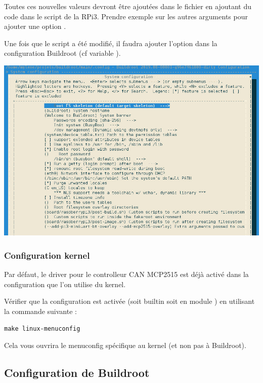 Toutes ces nouvelles valeurs devront être ajoutées dans le fichier 
en ajoutant du code dans le script  de la RPi3. Prendre
exemple sur les autres arguments pour ajouter une option .

Une fois que le script a été modifié, il faudra ajouter l'option dans la
configuration Buildroot (cf variable ).

\begin{centering}
\includegraphics[height=0.3\textheight]{pictures/04_labs/config_br_overlay.jpg} \\
\end{centering}

\subsubsection{Configuration kernel}

Par défaut, le driver pour le controlleur CAN MCP2515 est déjà activé dans
la configuration que l'on utilise du kernel.

Vérifier que la configuration  est activée (soit builtin 
soit en module ) en utilisant la commande suivante :

\begin{verbatim}
make linux-menuconfig
\end{verbatim}

Cela vous ouvrira le menuconfig spécifique au kernel (et non pas à Buildroot).

\subsection{Configuration de Buildroot}

